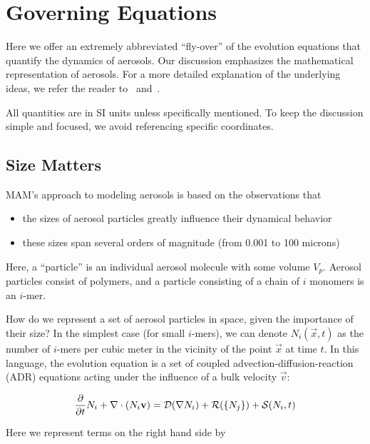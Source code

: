 \section{Governing Equations}

Here we offer an extremely abbreviated ``fly-over'' of the evolution equations
that quantify the dynamics of aerosols. Our discussion emphasizes the
mathematical representation of aerosols. For a more detailed explanation of
the underlying ideas, we refer the reader to~\cite{Whitby1991}
and~\cite{Friedlander1977}.

All quantities are in SI units unless specifically mentioned. To keep the
discussion simple and focused, we avoid referencing specific coordinates.

\subsection*{Size Matters}

MAM's approach to modeling aerosols is based on the observations that

\begin{itemize}
  \item the sizes of aerosol particles greatly influence their dynamical
        behavior
  \item these sizes span several orders of magnitude (from 0.001 to 100 microns)
\end{itemize}

Here, a ``particle'' is an individual aerosol molecule with some volume $V_p$.
Aerosol particles consist of polymers, and a particle consisting of a chain of
$i$ monomers is an $i$-mer.

How do we represent a set of aerosol particles in space, given the importance
of their size? In the simplest case (for small $i$-mers), we can denote
$N_i(\vec{x}, t)$ as the number of $i$-mers per cubic meter in the vicinity of
the point $\vec{x}$ at time $t$. In this language, the evolution equation is a
set of coupled advection-diffusion-reaction (ADR) equations acting under the
influence of a bulk velocity $\vec{v}$:

\begin{equation}\labeleq{small_imer_dNdt}
  \ddt{N_i} + \div{(N_i\vec{v})} = \mathcal{D}(\nabla N_i) +
                                   \mathcal{R}(\{N_j\}) +
                                   \mathcal{S}(N_i, t)
\end{equation}

Here we represent terms on the right hand side by

